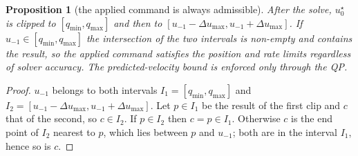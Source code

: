 \documentclass[11pt,a4paper]{article}
\newtheorem{proposition}[theorem]{Proposition}
\theoremstyle{remark}
\theoremstyle{definition}
\begin{document}
\begin{proposition}[the applied command is always admissible]\label{prop:feas}
After the solve, $u_0^\star$ is clipped to $[q_{\min},q_{\max}]$ and then to $[u_{-1}-\Delta u_{\max},u_{-1}+\Delta u_{\max}]$. If $u_{-1}\in[q_{\min},q_{\max}]$ the intersection of the two intervals is
non-empty and contains the result, so the applied command satisfies the position and rate limits regardless of solver accuracy. The predicted-velocity bound is enforced only through the QP.
\end{proposition}
\begin{proof}
$u_{-1}$ belongs to both intervals $I_1=[q_{\min},q_{\max}]$ and $I_2=[u_{-1}-\Delta u_{\max},u_{-1}+\Delta u_{\max}]$. Let $p\in I_1$ be the result of the first clip and $c$ that of the second, so $c\in I_2$.
If $p\in I_2$ then $c=p\in I_1$. Otherwise $c$ is the end point of $I_2$ nearest to $p$, which lies between $p$ and $u_{-1}$; both are in the interval $I_1$, hence so is $c$.
\end{proof}
\end{document}
